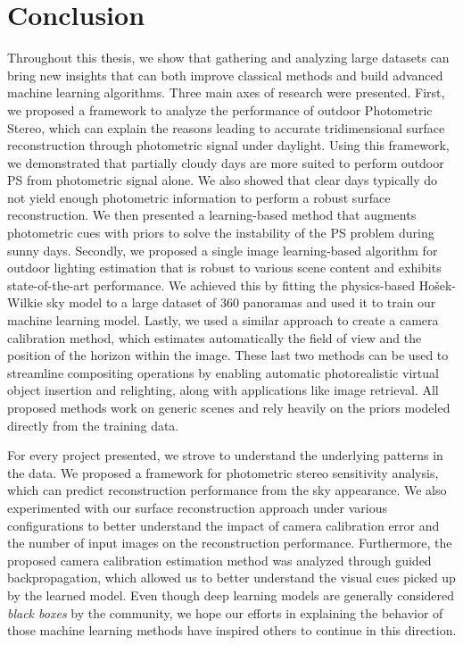\chapter*{Conclusion}         %


Throughout this thesis, we show that gathering and analyzing large datasets can bring new insights that can both improve classical methods and build advanced machine learning algorithms. Three main axes of research were presented. First, we proposed a framework to analyze the performance of outdoor Photometric Stereo, which can explain the reasons leading to accurate tridimensional surface reconstruction through photometric signal under daylight. Using this framework, we demonstrated that partially cloudy days are more suited to perform outdoor PS from photometric signal alone. We also showed that clear days typically do not yield enough photometric information to perform a robust surface reconstruction. We then presented a learning-based method that augments photometric cues with priors to solve the instability of the PS problem during sunny days. Secondly, we proposed a single image learning-based algorithm for outdoor lighting estimation that is robust to various scene content and exhibits state-of-the-art performance. We achieved this by fitting the physics-based Ho\v{s}ek-Wilkie sky model to a large dataset of 360 panoramas and used it to train our machine learning model. Lastly, we used a similar approach to create a camera calibration method, which estimates automatically the field of view and the position of the horizon within the image. These last two methods can be used to streamline compositing operations by enabling automatic photorealistic virtual object insertion and relighting, along with applications like image retrieval. All proposed methods work on generic scenes and rely heavily on the priors modeled directly from the training data. 

For every project presented, we strove to understand the underlying patterns in the data. We proposed a framework for photometric stereo sensitivity analysis, which can predict reconstruction performance from the sky appearance. We also experimented with our surface reconstruction approach under various configurations to better understand the impact of camera calibration error and the number of input images on the reconstruction performance. Furthermore, the proposed camera calibration estimation method was analyzed through guided backpropagation, which allowed us to better understand the visual cues picked up by the learned model. Even though deep learning models are generally considered \emph{black boxes} by the community, we hope our efforts in explaining the behavior of those machine learning methods have inspired others to continue in this direction.

